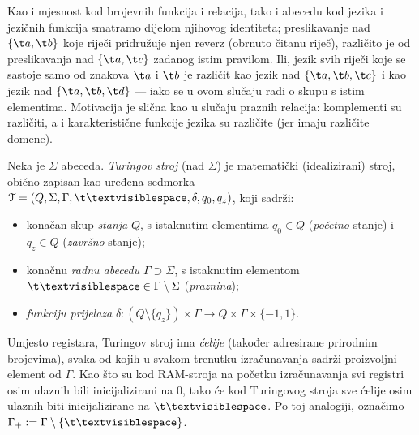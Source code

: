 \begin{napomena}
Kao i mjesnost kod brojevnih funkcija i relacija, tako i abecedu kod jezika i jezičnih funkcija smatramo dijelom njihovog identiteta; preslikavanje nad $\{\t a,\t b\}$ koje riječi pridružuje njen reverz (obrnuto čitanu riječ), različito je od preslikavanja nad $\{\t a,\t c\}$ zadanog istim pravilom. Ili, jezik svih riječi koje se sastoje samo od znakova $\t a$ i $\t b$ je različit kao jezik nad $\{\t a,\t b,\t c\}$ i kao jezik nad $\{\t a,\t b,\t d\}$ --- iako se u ovom slučaju radi o skupu s istim elementima. Motivacija je slična kao u slučaju praznih relacija: komplementi su različiti, a i karakteristične funkcije jezika su različite (jer imaju različite domene).
\end{napomena}

\begin{definicija}
Neka je $\Sigma$ abeceda. \emph{Turingov stroj} (nad $\Sigma$) je matematički (idealizirani) stroj, obično zapisan kao uređena sedmorka $\mathcal T=(Q,\Sigma,\Gamma,\bl,\delta,q_0,q_z)$, koji sadrži:
\begin{itemize}
    \item konačan skup \emph{stanja} $Q$, s istaknutim elementima $q_0\in Q$ (\emph{početno} stanje) i $q_z\in Q$ (\emph{završno} stanje);
    \item konačnu \emph{radnu abecedu} $\Gamma\supset\Sigma$, s istaknutim elementom $\bl\in\Gamma\setminus\Sigma$ (\emph{praznina});
    \item \emph{funkciju prijelaza} $\delta\colon(Q\setminus\{q_z\})\times\Gamma\to Q\times\Gamma\times\{-1,1\}$.\qedhere
\end{itemize}
\end{definicija}

Umjesto registara, Turingov stroj ima \emph{ćelije} (također adresirane prirodnim brojevima), svaka od kojih u svakom trenutku izračunavanja sadrži proizvoljni element od $\Gamma$. Kao što su kod RAM-stroja na početku izračunavanja svi registri osim ulaznih bili inicijalizirani na $0$, tako će kod Turingovog stroja sve ćelije osim ulaznih biti inicijalizirane na $\bl$. Po toj analogiji, označimo $\Gamma_+:=\Gamma\setminus\{\bl\}$.

